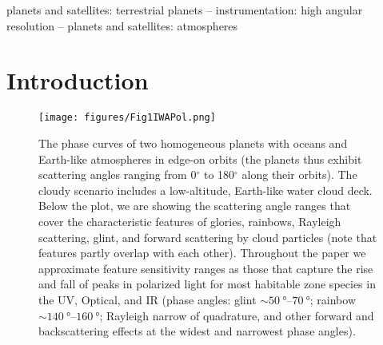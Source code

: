 \documentclass[
    usenatbib,
]{mnras}
\begin{document}
\begin{keywords}
planets and satellites: terrestrial planets -- 
instrumentation: high angular resolution -- 
planets and satellites: atmospheres
\end{keywords}


\section{Introduction}
\label{sec:intro}


\begin{figure*}
    \centering
    \texttt{[image: figures/Fig1IWAPol.png]}
    \caption{
        The phase curves of two homogeneous planets with oceans and Earth-like atmospheres in edge-on orbits (the planets thus exhibit scattering angles 
        ranging from 0$^\circ$ to 180$^\circ$ along their orbits). 
        The cloudy scenario includes a low-altitude, Earth-like water 
        cloud deck. 
        Below the plot, we are showing the scattering angle ranges that cover the
        characteristic features of glories, rainbows, Rayleigh scattering, glint, and forward scattering by cloud particles (note that features partly overlap
        with each other).  
        Throughout the paper we approximate feature sensitivity ranges as those that capture the rise and fall of peaks in polarized light for most habitable zone species in the UV, Optical, and IR (phase angles: glint $\sim\qtyrange{50}{70}{\degree}$; rainbow $\sim\SIrange{140}{160}{\degree}$; Rayleigh narrow of quadrature, and other forward and backscattering effects at the widest and narrowest phase angles).
    }
    \label{fig:bottplot}
\end{figure*}
\end{document}
